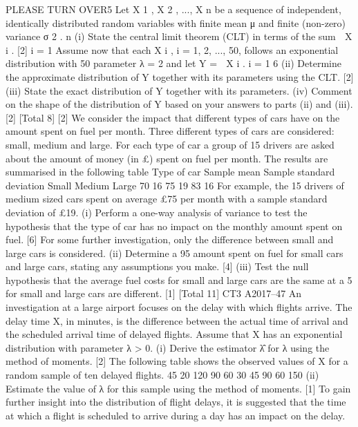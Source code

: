\documentclass[a4paper,12pt]{article}
\begin{document}
\begin{enumerate}
PLEASE TURN OVER5
Let X 1 , X 2 , ..., X n be a sequence of independent, identically distributed random
variables with finite mean μ and finite (non-zero) variance σ 2 .
n
(i)
State the central limit theorem (CLT) in terms of the sum
 X i .
[2]
i = 1
Assume now that each X i , i = 1, 2, ..., 50, follows an exponential distribution with
50
parameter λ = 2 and let Y =  X i .
i = 1
6
(ii) Determine the approximate distribution of Y together with its parameters using
the CLT.
[2]
(iii) State the exact distribution of Y together with its parameters.
(iv) Comment on the shape of the distribution of Y based on your answers to parts
(ii) and (iii).
[2]
[Total 8]
[2]
We consider the impact that different types of cars have on the amount spent on fuel
per month. Three different types of cars are considered: small, medium and large.
For each type of car a group of 15 drivers are asked about the amount of money (in £)
spent on fuel per month. The results are summarised in the following table
Type of car
Sample mean
Sample standard deviation
Small Medium Large
70
16
75
19
83
16
For example, the 15 drivers of medium sized cars spent on average £75 per month
with a sample standard deviation of £19.
(i)
Perform a one-way analysis of variance to test the hypothesis that the type of
car has no impact on the monthly amount spent on fuel.
[6]
For some further investigation, only the difference between small and large cars is
considered.
(ii) Determine a 95%
amount spent on fuel for small cars and large cars, stating any assumptions
you make.
[4]
(iii) Test the null hypothesis that the average fuel costs for small and large cars are
the same at a 5%
for small and large cars are different.
[1]
[Total 11]
CT3 A2017–47
An investigation at a large airport focuses on the delay with which flights arrive. The
delay time X, in minutes, is the difference between the actual time of arrival and the
scheduled arrival time of delayed flights. Assume that X has an exponential
distribution with parameter λ > 0.
(i)
Derive the estimator λ̂ for λ using the method of moments.
[2]
The following table shows the observed values of X for a random sample of ten
delayed flights.
45 20 120 90 60 30 45 90 60 150
(ii)
Estimate the value of λ for this sample using the method of moments.
[1]
To gain further insight into the distribution of flight delays, it is suggested that the
time at which a flight is scheduled to arrive during a day has an impact on the delay.

\end{enumerate}
\end{document}
